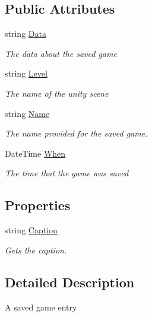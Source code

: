 \subsection*{Public Attributes}
\begin{DoxyCompactItemize}
\item 
string \hyperlink{class_level_serializer_1_1_save_entry_a64e2a1af5594210b57b9f173432a544f}{Data}
\begin{DoxyCompactList}\small\item\em The data about the saved game \end{DoxyCompactList}\item 
string \hyperlink{class_level_serializer_1_1_save_entry_ad1db450cc75d7fe8b98b8f5c423c424a}{Level}
\begin{DoxyCompactList}\small\item\em The name of the unity scene \end{DoxyCompactList}\item 
string \hyperlink{class_level_serializer_1_1_save_entry_ad83ac6d066dcdf4cbea45c5127105034}{Name}
\begin{DoxyCompactList}\small\item\em The name provided for the saved game. \end{DoxyCompactList}\item 
Date\+Time \hyperlink{class_level_serializer_1_1_save_entry_a9ea96ed3de57218ff1ca5c4fbfc02c49}{When}
\begin{DoxyCompactList}\small\item\em The time that the game was saved \end{DoxyCompactList}\end{DoxyCompactItemize}
\subsection*{Properties}
\begin{DoxyCompactItemize}
\item 
string \hyperlink{class_level_serializer_1_1_save_entry_a0a41b3b1fd07cf3eddc2262ee569a7e5}{Caption}
\begin{DoxyCompactList}\small\item\em Gets the caption. \end{DoxyCompactList}\end{DoxyCompactItemize}


\subsection{Detailed Description}
A saved game entry 



